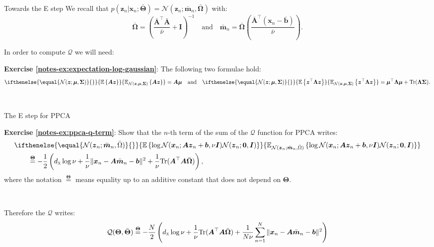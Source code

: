 \documentclass{beamer}
\newcommand{\bs}[1]{\boldsymbol{#1}}
\newcommand{\expectation}[2][]{%
\ifthenelse { \equal {#1} {} }%
{\mathbb{E}\left\{#2\right\}}%
{\mathbb{E}_{#1}\left\{#2\right\}}
}
\newcommand{\exercise}[2]{\noindent\colorbox{blue!10}{\parbox{0.995\textwidth}{\textbf{Exercise \ref{notes-ex:#1}}: #2}}\\}
\begin{document}
\begin{frame}{Towards the E step}
We recall that $p(\bs{z}_n|\bs{x}_n;\bar{\bs{\Theta}})=\mathcal{N}(\bs{z}_n;\bar{\bs{m}}_n,\bar{\bs{\Omega}})$ with:
\[
\bar{\bs{\Omega}} = \left(\frac{\bar{\bs{A}}^\top\bar{\bs{A}}}{\bar{\nu}}+\bs{I}\right)^{-1} \quad\text{and}\quad \bar{\bs{m}}_n=\bar{\bs{\Omega}}\left(\frac{\bar{\bs{A}}^\top(\bs{x}_n-\bar{\bs{b}})}{\bar{\nu}}\right) .
\]\vspace{3mm}

In order to compute $\mathcal{Q}$ we will need:\vspace{3mm}
\exercise{expectation-log-gaussian}{The following two formulae hold:
\[
 \expectation[\mathcal{N}(\bs{z};\bs{\mu},\bs{\Sigma})]{\bs{A}\bs{z}} = \bs{A}\bs{\mu} \quad\text{and}\quad \expectation[\mathcal{N}(\bs{z};\bs{\mu},\bs{\Sigma})]{\bs{z}^\top\bs{\Lambda}\bs{z}} = \bs{\mu}^\top\bs{\Lambda}\bs{\mu} + \textrm{Tr}(\bs{\Lambda}\bs{\Sigma}).  
\]
}\vspace{2mm}
\end{frame}

\begin{frame}{The E step for PPCA}
 \exercise{ppca-q-term}{Show that the $n$-th term of the sum of the $\mathcal{Q}$ function for PPCA writes:
\begin{align*}
 &\expectation[\mathcal{N}(\bs{z}_n;\bar{\bs{m}}_n,\bar{\Omega})]{\log \mathcal{N}(\bs{x}_n;\bs{A}\bs{z}_n+\bs{b},\nu\bs{I})\mathcal{N}(\bs{z}_n;\bs{0},\bs{I})}\\
 &\qquad\stackrel{\bs{\Theta}}{=} -\frac{1}{2}\left(d_{\textsc{x}}\log\nu + \frac{1}{\nu}\|\bs{x}_n-\bs{A}\bar{\bs{m}}_n-\bs{b}\|^2 + \frac{1}{\nu}\textrm{Tr}(\bs{A}^\top\bs{A}\bar{\bs{\Omega}})\right),
\end{align*}
where the notation $ \stackrel{\bs{\Theta}}{=} $ means equality up to an additive constant that does not depend on $\bs{\Theta}$.
}\pause\vspace{2mm}

Therefore the $\mathcal{Q}$ writes:
\begin{align*}
 \mathcal{Q}(\bs{\Theta},\bar{\bs{\Theta}}) \stackrel{\bs{\Theta}}{=} -\frac{N}{2}\left(d_{\textsc{x}}\log\nu  + \frac{1}{\nu}\textrm{Tr}(\bs{A}^\top\bs{A}\bar{\bs{\Omega}}) + \frac{1}{N\nu}\sum_{n=1}^N\|\bs{x}_n-\bs{A}\bar{\bs{m}}_n-\bs{b}\|^2\right)
\end{align*}
\end{frame}
\end{document}
